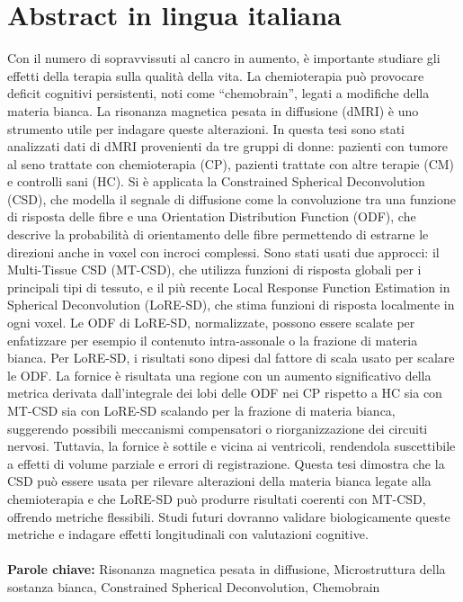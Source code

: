 \documentclass{Configuration_Files/PoliMi3i_thesis}
\begin{document}
\chapter*{Abstract in lingua italiana}
Con il numero di sopravvissuti al cancro in aumento, è importante studiare gli effetti della terapia sulla qualità della vita. La chemioterapia può provocare deficit cognitivi persistenti, noti come “chemobrain”, legati a modifiche della materia bianca. La risonanza magnetica pesata in diffusione (dMRI) è uno strumento utile per indagare queste alterazioni.
In questa tesi sono stati analizzati dati di dMRI provenienti da tre gruppi di donne: pazienti con tumore al seno trattate con chemioterapia (CP), pazienti trattate con altre terapie (CM) e controlli sani (HC). Si è applicata la Constrained Spherical Deconvolution (CSD), che modella il segnale di diffusione come la convoluzione tra una funzione di risposta delle fibre e una Orientation Distribution Function (ODF), che descrive la probabilità di orientamento delle fibre permettendo di estrarne le direzioni anche in voxel con incroci complessi.
Sono stati usati due approcci: il Multi-Tissue CSD (MT-CSD), che utilizza funzioni di risposta globali per i principali tipi di tessuto, e il più recente Local Response Function Estimation in Spherical Deconvolution (LoRE-SD), che stima funzioni di risposta localmente in ogni voxel. Le ODF di LoRE-SD, normalizzate, possono essere scalate per enfatizzare per esempio il contenuto intra-assonale o la frazione di materia bianca.
Per LoRE-SD, i risultati sono dipesi dal fattore di scala usato per scalare le ODF. La fornice è risultata una regione con un aumento significativo della metrica derivata dall’integrale dei lobi delle ODF nei CP rispetto a HC sia con MT-CSD sia con LoRE-SD scalando per la frazione di materia bianca, suggerendo possibili meccanismi compensatori o riorganizzazione dei circuiti nervosi. Tuttavia, la fornice è sottile e vicina ai ventricoli, rendendola suscettibile a effetti di volume parziale e errori di registrazione.
Questa tesi dimostra che la CSD può essere usata per rilevare alterazioni della materia bianca legate alla chemioterapia e che LoRE-SD può produrre risultati coerenti con MT-CSD, offrendo metriche flessibili. Studi futuri dovranno validare biologicamente queste metriche e indagare effetti longitudinali con valutazioni cognitive.\\
\\
\textbf{Parole chiave:} Risonanza magnetica pesata in diffusione, Microstruttura della sostanza bianca, Constrained Spherical Deconvolution, Chemobrain %
\end{document}
